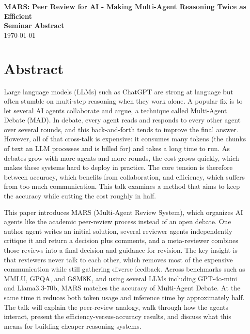 \documentclass[12pt]{article}
\newcommand{\seminardate}{\today}
\begin{document}
\begin{center}
  {\LARGE\bfseries MARS: Peer Review for AI - Making Multi-Agent Reasoning Twice as Efficient}\\[8pt]
  {\large\bfseries Seminar Abstract}\\[6pt]
  {\normalsize \seminardate}
\end{center}
\vspace{1.5em}

\section*{Abstract}
Large language models (LLMs) such as ChatGPT are strong at language but often stumble on multi-step reasoning when they work alone. A popular fix is to let several AI agents collaborate and argue, a technique called Multi-Agent Debate (MAD). In debate, every agent reads and responds to every other agent over several rounds, and this back-and-forth tends to improve the final answer. However, all of that cross-talk is expensive: it consumes many tokens (the chunks of text an LLM processes and is billed for) and takes a long time to run. As debates grow with more agents and more rounds, the cost grows quickly, which makes these systems hard to deploy in practice. The core tension is therefore between accuracy, which benefits from collaboration, and efficiency, which suffers from too much communication. This talk examines a method that aims to keep the accuracy while cutting the cost roughly in half.

This paper introduces MARS (Multi-Agent Review System), which organizes AI agents like the academic peer-review process instead of an open debate. One author agent writes an initial solution, several reviewer agents independently critique it and return a decision plus comments, and a meta-reviewer combines those reviews into a final decision and guidance for revision. The key insight is that reviewers never talk to each other, which removes most of the expensive communication while still gathering diverse feedback. Across benchmarks such as MMLU, GPQA, and GSM8K, and using several LLMs including GPT-4o-mini and Llama3.3-70b, MARS matches the accuracy of Multi-Agent Debate. At the same time it reduces both token usage and inference time by approximately half. The talk will explain the peer-review analogy, walk through how the agents interact, present the efficiency-versus-accuracy results, and discuss what this means for building cheaper reasoning systems.
\end{document}
